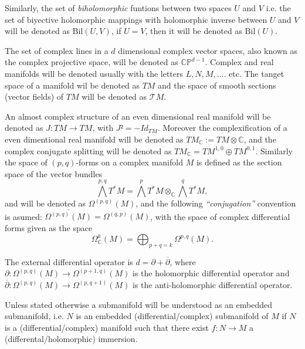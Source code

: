 \documentclass[12pt,twoside,a4paper]{report}
\newcommand{\co}{\ensuremath{\mathbb C }}
\newcommand{\cp}{\ensuremath{\mathbb{CP}}}
\newcommand{\om}{\ensuremath{\Omega}}
\begin{document}
Similarly, the set of \emph{biholomorphic} funtions between two spaces $U$ and $V$ i.e. the set of biyective holomorphic mappings with holomorphic inverse between $U$ and $V$ will be denoted as $\mathrm{Bil}(U,V)$, if $U=V$, then it will be denoted as $\mathrm{Bil}(U).$

The set of complex lines in a $d$ dimensional complex vector spaces, also known as the complex projective space, will be denoted as $\cp^{d-1}$. Complex and real manifolds will be denoted usually with the letters $L, N, M,\dots$. etc. The tanget space of a manifold wil be denoted as $TM$ and the space of smooth sections (vector fields) of $TM$ will be denoted as $\mathcal{T}M$.

An almost complex structure of an even dimensional real manifold will be denoted as $J:TM\rightarrow TM$, with $J²=-Id_{TM}$. Moreover the complexification of a even dimentional real manifold will be denoted as $TM_{\co}:=TM\otimes\co$, and the complex conjugate splitting will be denoted as $TM_{\co}=TM^{1,0}\oplus TM^{0,1}$.
Similarly the space of $(p,q)$-forms on a complex manifold $M$ is  defined as the section space of the vector bundles
\[
  \bigwedge^{p,q}T^{*}M=\bigwedge^{p}T^{*}M\otimes_{\co}\bigwedge^{q}T^{*}M,
\]
\noindent and will be denoted as $\Omega^{(p,q)}(M)$, and the following \emph{``conjugation''} convention is asumed: $\overline{\om^{(p,q)}(M)}=\om^{(q,p)}(M)$, with the space of complex differential forms given as the space
\[
  \om^{k}_{\co}(M)=\bigoplus_{p+q=k}\om^{p,q}(M).
\]

The external differential operator is $d=\partial + \overline{\partial}$, where $\partial:\om^{(p,q)}(M)\rightarrow \om^{(p+1,q)}(M)$ is the holomorphic differential operator and $\overline{\partial}:\om^{(p,q)}(M)\rightarrow\om^{(p,q+1)}(M)$ is the anti-holomorphic differential operator.

Unless stated otherwise a submanifold will be understood as an embedded submanifold, i.e. $N$ is an embedded (differential/complex) submanifold of $M$ if $N$ is a (differential/complex) manifold such that there exist $f:N\rightarrow M$ a (differental/holomorphic) immersion.
\end{document}
